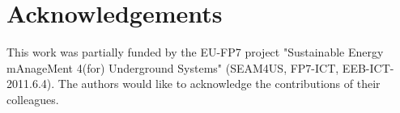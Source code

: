 \section*{Acknowledgements}
\label{sec:acknowledgements}

This work was partially funded by the EU-FP7 project "Sustainable Energy mAnageMent 4(for) Underground Systems" (SEAM4US, FP7-ICT, EEB-ICT-2011.6.4). The authors would like to acknowledge the contributions of their colleagues.